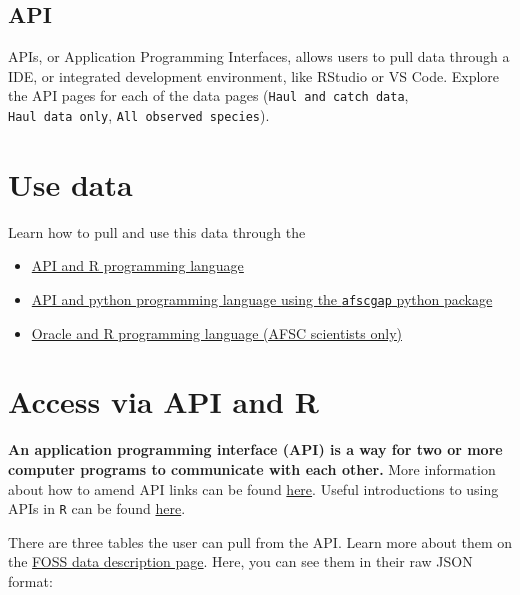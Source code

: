 \documentclass[
  letterpaper,
  oneside,
  open=any]{scrbook}
\providecommand{\tightlist}{%
  \setlength{\itemsep}{0pt}\setlength{\parskip}{0pt}}\usepackage{longtable,booktabs,array}
\begin{document}
\section{API}\label{api}

APIs, or Application Programming Interfaces, allows users to pull data
through a IDE, or integrated development environment, like RStudio or VS
Code. Explore the API pages for each of the data pages
(\texttt{Haul\ and\ catch\ data}, \texttt{Haul\ data\ only},
\texttt{All\ observed\ species}).

\chapter{Use data}\label{use-data}

Learn how to pull and use this data through the

\begin{itemize}
\tightlist
\item
  \href{https://afsc-gap-products.github.io/gap_products/content/foss-api-r.html}{API
  and R programming language}
\item
  \href{https://afsc-gap-products.github.io/gap_products/content/foss-api-py.html}{API
  and python programming language using the \texttt{afscgap} python
  package}
\item
  \href{https://afsc-gap-products.github.io/gap_products/content/foss-oracle-r.html}{Oracle
  and R programming language (AFSC scientists only)}
\end{itemize}

\chapter{Access via API and R}\label{access-via-api-and-r}

\textbf{An application programming interface (API) is a way for two or
more computer programs to communicate with each other.} More information
about how to amend API links can be found
\href{https://docs.oracle.com/en/database/oracle/oracle-rest-data-services/22.3/books.html\#AELIG90103/}{here}.
Useful introductions to using APIs in \texttt{R} can be found
\href{https://www.dataquest.io/blog/r-api-tutorial/}{here}.

There are three tables the user can pull from the API. Learn more about
them on the
\href{https://afsc-gap-products.github.io/gap_products/content/foss-metadata.html}{FOSS
data description page}. Here, you can see them in their raw JSON format:
\end{document}
